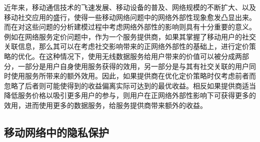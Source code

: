 
近年来，移动通信技术的飞速发展、移动设备的普及、网络规模的不断扩大、以及移动社交应用的盛行，使得一些移动网络问题中的网络外部性现象愈发凸显出来。而在对这些问题的分析建模过程中考虑网络外部性的影响则具有十分重要的意义。
例如在网络服务定价问题中，作为一个服务提供商，如果其掌握了移动用户的社交关联信息，那么其可以在考虑社交影响带来的正网络外部性的基础上，进行定价策略的优化。在这种情况下，使用无线数据服务给用户带来的价值可以被分成两部分，一部分是用户自身使用服务获得的效用，另一部分是与其有社交关联的用户同时使用服务所带来的额外效用。因此，如果提供商在优化定价策略时仅考虑前者而忽略了后者则可能使得到的收益偏离实际可达到的最优收益。相反如果提供商适当降低服务价格以吸引更多用户的参与，则用户在正网络外部性影响下可获得更多的效用，进而使用更多的数据服务，给服务提供商带来额外的收益。


\subsection{移动网络中的隐私保护}

